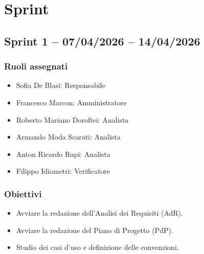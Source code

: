 \section{Sprint}

\subsection{Sprint 1 -- 07/04/2026 -- 14/04/2026}
\label{sec:sprint1}

\subsubsection{Ruoli assegnati}
\begin{itemize}
    \item Sofia De Blasi: Responsabile 
    \item Francesco Marcon: Amministratore 
    \item Roberto Mariano Doroftei: Analista 
    \item Armando Moda Scarati: Analista  
    \item Anton Ricardo Rupi: Analista 
    \item Filippo Idiometri: Verificatore 
\end{itemize}

\subsubsection{Obiettivi}
\begin{itemize}
    \item Avviare la redazione dell'Analisi dei Requisiti (AdR).
    \item Avviare la redazione del Piano di Progetto (PdP).
    \item Studio dei casi d'uso e definizione delle convenzioni.
\end{itemize}

